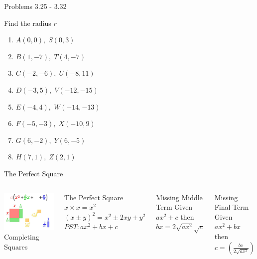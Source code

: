 \documentclass[14pt,aspectratio=169]{beamer}
\begin{document}
\begin{frame}{Problems 3.25 - 3.32}
 \begin{exampleblock}{Find the radius $r$}
  \begin{enumerate}
   \item $A(0,0),   \;S(0,3)$
   \item $B(1,-7),    \;T(4,-7)$
   \item $C(-2,-6),   \;U(-8,11)$
   \item $D(-3,5),  \;V(-12,-15)$
   \item $E(-4,4),   \;W(-14,-13)$
   \item $F(-5,-3),  \;X(-10,9)$
   \item $G(6,-2),  \;Y(6,-5)$
   \item $H(7,1),  \;Z(2,1)$
  \end{enumerate}

 \end{exampleblock}

\end{frame}

\begin{frame}{The Perfect Square}
 \begin{columns}
  \centering
  \includegraphics[width=1\textwidth]{image08}\\Completing Squares
  \begin{block}{The Perfect Square}\centering
   $x\times x = x^2$ \\
   $(x\pm y)^2 = x^2 \pm 2xy + y^2$ \\
   $PST: ax^2 + bx + c$
  \end{block}

  \begin{block}{Missing Middle Term}\centering
   Given $ax^2 + c$
   then $bx = 2\sqrt{ax^2}\sqrt{c}$
  \end{block}

  \begin{block}{Missing Final Term}\centering
   Given $ax^2 + bx$
   then $c=\left(\frac{bx}{2\sqrt{ax^2}}\right)$
  \end{block}


 \end{columns}

\end{frame}
\end{document}
